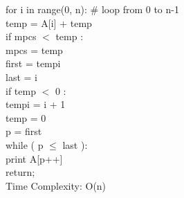 \documentclass{article}
\newcommand\tab[1][4mm]{\hspace*{#1}}
\begin{document}
\tab for i in range(0, n): \# loop from 0 to n-1  \\
\tab\tab temp = A[i] + temp \\
\tab\tab if mpcs $<$ temp : \\
\tab\tab\tab mpcs = temp \\
\tab\tab\tab first = tempi \\
\tab\tab\tab last = i \\
\tab if temp $<$ 0 : \\
\tab\tab tempi = i + 1 \\
\tab\tab temp = 0 \\
\tab p = first \\
\tab while ( p $\leq$ last ): \\
\tab\tab print A[p++] \\
\tab return; \\
Time Complexity: O(n)
     
\end{document}
